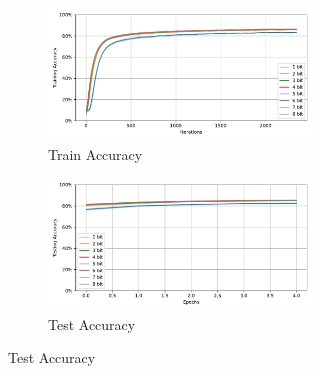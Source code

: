     \label{appendix:accuracy_curves_fashion_mnist}
        \begin{figure}[H]
            \centering
            \begin{subfigure}[H]{0.55\textwidth}
                \centering
                \begin{subfigure}[H]{\textwidth}
                    \centering
                    \includegraphics[width=\textwidth]{../standard/FashionMNIST/plots/fashionmnist_train_acc.pdf}
                    \caption{Train Accuracy}
                \end{subfigure}
                \hfill
                \begin{subfigure}[H]{\textwidth}
                    \centering
                    \includegraphics[width=\textwidth]{../standard/FashionMNIST/plots/fashionmnist_test_acc.pdf}
                    \caption{Test Accuracy}
                \end{subfigure}
            \end{subfigure}
            \hfill
            \begin{subfigure}[H]{0.3\textwidth}
                \centering

\end{subfigure}
\end{figure}
